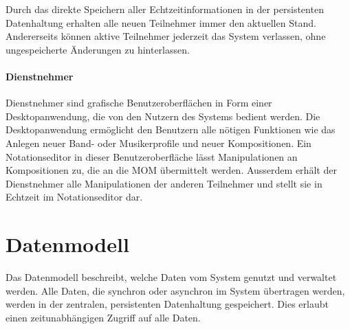 \documentclass[12pt]{scrartcl}
\begin{document}
Durch das direkte Speichern aller Echtzeitinformationen in der persistenten Datenhaltung erhalten alle neuen Teilnehmer immer den aktuellen Stand. Andererseits können aktive Teilnehmer jederzeit das System verlassen, ohne ungespeicherte Änderungen zu hinterlassen.

\paragraph{Dienstnehmer}
Dienstnehmer sind grafische Benutzeroberflächen in Form einer Desktopanwendung, die von den Nutzern des Systems bedient werden. Die Desktopanwendung ermöglicht den Benutzern alle nötigen Funktionen wie das Anlegen neuer Band- oder Musikerprofile und neuer Kompositionen. Ein Notationseditor in dieser Benutzeroberfläche lässt Manipulationen an Kompositionen zu, die an die MOM übermittelt werden. Ausserdem erhält der Dienstnehmer alle Manipulationen der anderen Teilnehmer und stellt sie in Echtzeit im Notationseditor dar.


\section{Datenmodell}
\label{sec:datenmodell}


Das Datenmodell beschreibt, welche Daten vom System genutzt und verwaltet werden. Alle Daten, die synchron oder asynchron im System übertragen werden, werden in der zentralen, persistenten Datenhaltung gespeichert. Dies erlaubt einen zeitunabhängigen Zugriff auf alle Daten. 
\end{document}
